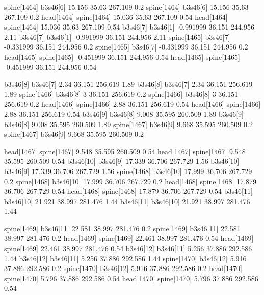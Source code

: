 spine[1464]    b3s46[6]    15.156    35.63    267.109    0.2
spine[1464]    b3s46[6]    15.156    35.63    267.109    0.2
head[1464]    spine[1464]    15.036    35.63    267.109    0.54
head[1464]    spine[1464]    15.036    35.63    267.109    0.54
b3s46[7]    b3s46[1]    -0.991999    36.151    244.956    2.11
b3s46[7]    b3s46[1]    -0.991999    36.151    244.956    2.11
spine[1465]    b3s46[7]    -0.331999    36.151    244.956    0.2
spine[1465]    b3s46[7]    -0.331999    36.151    244.956    0.2
head[1465]    spine[1465]    -0.451999    36.151    244.956    0.54
head[1465]    spine[1465]    -0.451999    36.151    244.956    0.54


b3s46[8]    b3s46[7]    2.34    36.151    256.619    1.89
b3s46[8]    b3s46[7]    2.34    36.151    256.619    1.89
spine[1466]    b3s46[8]    3    36.151    256.619    0.2
spine[1466]    b3s46[8]    3    36.151    256.619    0.2
head[1466]    spine[1466]    2.88    36.151    256.619    0.54
head[1466]    spine[1466]    2.88    36.151    256.619    0.54
b3s46[9]    b3s46[8]    9.008    35.595    260.509    1.89
b3s46[9]    b3s46[8]    9.008    35.595    260.509    1.89
spine[1467]    b3s46[9]    9.668    35.595    260.509    0.2
spine[1467]    b3s46[9]    9.668    35.595    260.509    0.2


head[1467]    spine[1467]    9.548    35.595    260.509    0.54
head[1467]    spine[1467]    9.548    35.595    260.509    0.54
b3s46[10]    b3s46[9]    17.339    36.706    267.729    1.56
b3s46[10]    b3s46[9]    17.339    36.706    267.729    1.56
spine[1468]    b3s46[10]    17.999    36.706    267.729    0.2
spine[1468]    b3s46[10]    17.999    36.706    267.729    0.2
head[1468]    spine[1468]    17.879    36.706    267.729    0.54
head[1468]    spine[1468]    17.879    36.706    267.729    0.54
b3s46[11]    b3s46[10]    21.921    38.997    281.476    1.44
b3s46[11]    b3s46[10]    21.921    38.997    281.476    1.44


spine[1469]    b3s46[11]    22.581    38.997    281.476    0.2
spine[1469]    b3s46[11]    22.581    38.997    281.476    0.2
head[1469]    spine[1469]    22.461    38.997    281.476    0.54
head[1469]    spine[1469]    22.461    38.997    281.476    0.54
b3s46[12]    b3s46[11]    5.256    37.886    292.586    1.44
b3s46[12]    b3s46[11]    5.256    37.886    292.586    1.44
spine[1470]    b3s46[12]    5.916    37.886    292.586    0.2
spine[1470]    b3s46[12]    5.916    37.886    292.586    0.2
head[1470]    spine[1470]    5.796    37.886    292.586    0.54
head[1470]    spine[1470]    5.796    37.886    292.586    0.54


